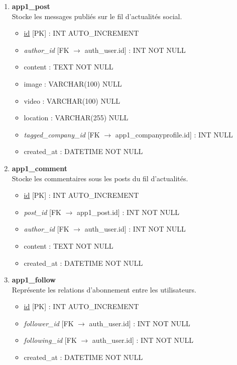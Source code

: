 \begin{enumerate}
    \item \textbf{app1\_post} \\
    Stocke les messages publiés sur le fil d'actualités social.
    \begin{itemize}
        \item \underline{id} [PK] : INT AUTO\_INCREMENT
        \item \textit{author\_id} [FK $\rightarrow$ auth\_user.id] : INT NOT NULL
        \item content : TEXT NOT NULL
        \item image : VARCHAR(100) NULL
        \item video : VARCHAR(100) NULL
        \item location : VARCHAR(255) NULL
        \item \textit{tagged\_company\_id} [FK $\rightarrow$ app1\_companyprofile.id] : INT NULL
        \item created\_at : DATETIME NOT NULL
    \end{itemize}

    \item \textbf{app1\_comment} \\
    Stocke les commentaires sous les posts du fil d'actualités.
    \begin{itemize}
        \item \underline{id} [PK] : INT AUTO\_INCREMENT
        \item \textit{post\_id} [FK $\rightarrow$ app1\_post.id] : INT NOT NULL
        \item \textit{author\_id} [FK $\rightarrow$ auth\_user.id] : INT NOT NULL
        \item content : TEXT NOT NULL
        \item created\_at : DATETIME NOT NULL
    \end{itemize}

    \item \textbf{app1\_follow} \\
    Représente les relations d'abonnement entre les utilisateurs.
    \begin{itemize}
        \item \underline{id} [PK] : INT AUTO\_INCREMENT
        \item \textit{follower\_id} [FK $\rightarrow$ auth\_user.id] : INT NOT NULL
        \item \textit{following\_id} [FK $\rightarrow$ auth\_user.id] : INT NOT NULL
        \item created\_at : DATETIME NOT NULL
    \end{itemize}


\end{enumerate}

